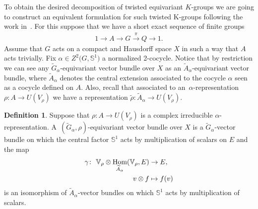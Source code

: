\documentclass[10pt,a4paper]{amsart}
\def\S{\mathbb{S}}
\def\V{\mathbb{V}}
\DeclareMathOperator{\Hom}{\textup{Hom}}
\theoremstyle{definition}
\newtheorem{Def}[Th]{Definition}
\numberwithin{equation}{section}
\begin{document}
To obtain the desired decomposition of twisted equivariant $K$-groups we are going to construct an equivalent
formulation for such twisted K-groups following the work in~\cite{GomezUribe}. For this suppose
that we have a short exact sequence of finite groups
\begin{gather*}
1\rightarrow A\rightarrow G\stackrel{\pi}{\rightarrow} Q\rightarrow 1.
\end{gather*}
Assume that $G$ acts on a compact and Hausdorff space $X$ in such a way that $A$ acts trivially.
Fix $\alpha\in Z^{2}\big(G,\S^{1}\big)$ a normalized 2-cocycle. Notice that by restriction we can
see any $\widetilde{G}_{\alpha}$-equivariant vector bundle over $X$ as an
$\widetilde{A}_{\alpha}$-equivariant vector bundle, where $\widetilde{A}_{\alpha}$ denotes the
central extension associated to the cocycle $\alpha$ seen as a cocycle defined on $A$.
Also, recall that associated to an~$\alpha$-representation $\rho\colon A \rightarrow U(V_{\rho})$ we have a representation
$\tilde{\rho}\colon \widetilde{A}_{\alpha} \rightarrow U(V_{\rho})$.

{\sloppy\begin{Def}
Suppose that $\rho\colon A \rightarrow U(V_{\rho})$ is a complex irreducible $\alpha$-representation.
A~$(\widetilde{G}_{\alpha}, \rho)$-equivariant vector bundle over $X$ is a
$\widetilde{G}_{\alpha}$-vector bundle on which the central factor $\S^{1}$ acts
by multiplication of scalars on $E$ and the map
\begin{align*}
\gamma\colon\ \V_{\rho}\otimes \Hom_{\widetilde{A}_{\alpha}}(\V_{\rho},E)&\rightarrow E,
\\
v\otimes f &\mapsto f(v)
\end{align*}
is an isomorphism of $\widetilde{A}_{\alpha}$-vector bundles on which $\S^{1}$ acts
by multiplication of scalars.
\end{Def}

}
\end{document}
